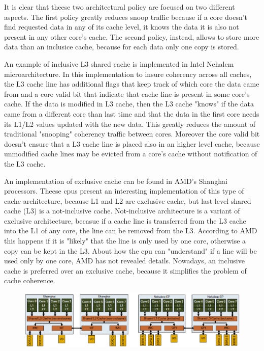 It is clear that theese two architectural policy are focused on two different aspects. The first policy greatly reduces snoop traffic because if a core 
doesn't find requested data in any of its cache level, it knows the data it is also not present in any other core's cache. The second policy, instead, 
allows to store more data than an inclusice cache, because for each data only one copy is stored.

An example of inclusive L3 shared cache is implemented in Intel Nehalem microarchitecture. In this implementation to insure coherency across 
all caches, the L3 cache line has additional flags that keep track of which core the data came from and a core valid bit that indicate that cache line 
is present in some core's cache. If the data is modified in L3 cache, then the L3 cache "knows" if the data came from a different core than last time 
and that the data in the first core needs its L1/L2 values updated with the new data. This greatly reduces the amount of traditional "snooping"
coherency traffic between cores. Moreover the core valid bit doesn't ensure that a L3 cache line is placed also in an higher level cache, because unmodified
cache lines may be evicted from a core's cache without notification of the L3 cache.

An implementation of exclusive cache can be found in AMD's Shanghai processors. Theese cpus present an interesting implementation of this type of cache
architecture, because L1 and L2 are exclusive cache, but last level shared cache (L3) is a not-inclusive cache.
Not-inclusive architecture is a variant of exclusive architecture, becasue if a cache line is transferred from the L3 cache into the L1 of any core, the 
line can be removed from the L3. According to AMD this happens if it is "likely" that the line is only used by one core, otherwise a copy can be kept in 
the L3. About how the cpu can "understand" if a line will be used only by one core, AMD has not revealed details. Nowadays, an inclusive cache is 
preferred over an exclusive cache, because it simplifies the problem of cache coherence. 

\begin{figure}[htbp]
\centering
\includegraphics[width=\widefigure]{images/neh_amd.eps}
\caption{}
\label{fig:neh_amd}
\end{figure}

